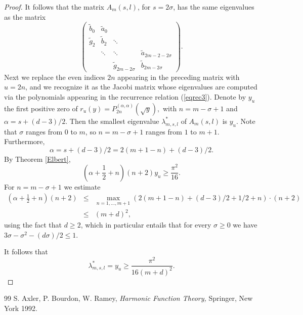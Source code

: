 \documentclass[10pt,a4paper]{amsart}
\begin{document}
\begin{proof}
It follows that the matrix $A_{m}\left( s,l\right) $, for $s=2\sigma $, has the
same eigenvalues as the matrix
\begin{equation*}
\left( 
\begin{array}{cccc}
\widetilde{b}_{0} & \widetilde{a}_{0} &  &  \\ 
\widetilde{g}_{2} & \widetilde{b}_{2} & \ddots  &  \\ 
& \ddots  & \ddots  & \widetilde{a}_{2m- 2 - 2\sigma } \\ 
&  & \widetilde{g}_{2m-2\sigma } & \widetilde{b}_{2m-2\sigma }
\end{array}
\right). 
\end{equation*}%
Next we replace the even indices $2n$ appearing
in the preceding matrix with $u = 2n$, 
and we recognize it as the Jacobi matrix
whose eigenvalues are computed via the polynomials appearing in the recurrence relation (\ref{eqrec3}). 
Denote  by  $y_u$ the first positive zero  of $r_u (y) =
P_{2n}^{\left( \alpha ,\alpha \right) } \left( \sqrt{y}\right),$ 
with $n =  m-\sigma +1$ and $\alpha
=s+\left( d-3\right) /2.$  Then  the smallest eigenvalue $\lambda _{m, s,l}^{\ast }$  of $
A_{m}\left( s,l\right) $ is $y_u$.  
Note that $\sigma $ ranges from $
0$ to $m$, so $n =m-\sigma +1$ ranges from $1$ to $m+1.$ Furthermore,  
\begin{equation*}
\alpha =s+\left( d-3\right) /2=2\left( m+1-n\right) +\left( d-3\right) /2.
\end{equation*}
By Theorem \ref{Elbert},
\begin{equation*}
\left( \alpha +\frac{1}{2}+n\right) \left( n+2\right) y_u\geq \frac{\pi ^{2}}{16}.
\end{equation*}
For $n=m-\sigma +1$ we estimate     
\begin{eqnarray*}
\left( \alpha +\frac{1}{2}+n \right) \left( n+2\right)  &\leq
&\max_{n=1,\dots , m+1}\left( 2\left( m+1-n\right) +\left( d-3\right) /2 + 1/2 +    n \right)
\cdot \left( n+2\right)  \\
&\leq & \left( m + d \right)^{2},
\end{eqnarray*}
using the fact that $d \ge 2$, which in particular entails that for every $\sigma \ge 0$ we have $3 \sigma - \sigma^2 - (d \sigma)/2 \le 1$. 

It follows that  
\begin{equation*}
\lambda _{m, s,l}^{\ast } 
=
 y_{u} 
\geq 
\frac{\pi ^{2}}{16\left( m+ d\right)^{2}}.
\end{equation*}
\end{proof}

\begin{thebibliography}{99}
 S. Axler, P. Bourdon, W. Ramey, \emph{Harmonic Function Theory,} Springer, New York 1992.
\end{thebibliography}
\end{document}
